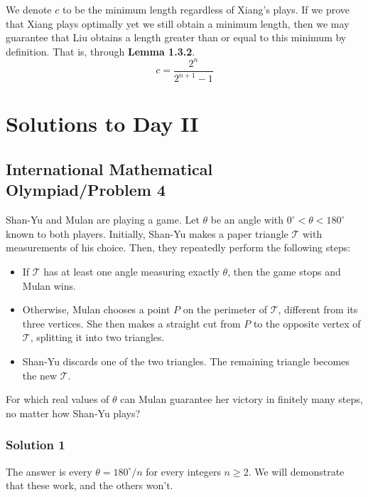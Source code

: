 \documentclass[11pt]{article}
\begin{document}
We denote $c$ to be the minimum length regardless of Xiang's plays. If we prove that Xiang plays optimally yet we still obtain a minimum length, then we may guarantee that Liu obtains a length greater than or equal to this minimum by definition. That is, through \textcolor{BrightAqua}{\textbf{Lemma 1.3.2}}.
\[c = \boxed{\frac{2^n}{2^{n+1} - 1}}\]

\newpage
\section{Solutions to Day II}
\subsection{International Mathematical Olympiad/Problem 4}
\begin{problem*}
    Shan-Yu and Mulan are playing a game. Let $\theta$ be an angle with $0^\circ < \theta < 180^\circ$ known to both players. Initially, Shan-Yu makes a paper triangle $\mathcal{T}$ with measurements of his choice. Then, they repeatedly perform the following steps:
\begin{itemize}
    \item If $\mathcal{T}$ has at least one angle measuring exactly $\theta$, then the game stops and Mulan wins.
    \item Otherwise, Mulan chooses a point $P$ on the perimeter of $\mathcal{T}$, different from its three vertices. She then makes a straight cut from $P$ to the opposite vertex of $\mathcal{T}$, splitting it into two triangles.
    \item Shan-Yu discards one of the two triangles. The remaining triangle becomes the new $\mathcal{T}$.
\end{itemize}
For which real values of $\theta$ can Mulan guarantee her victory in finitely many steps, no matter how Shan-Yu plays?
\end{problem*}
\subsubsection{Solution 1}
The answer is every $\boxed{\theta=180^{\circ}/n}$ for every integers $n\geqslant 2$. We will demonstrate that these work, and the others won't.
\end{document}
